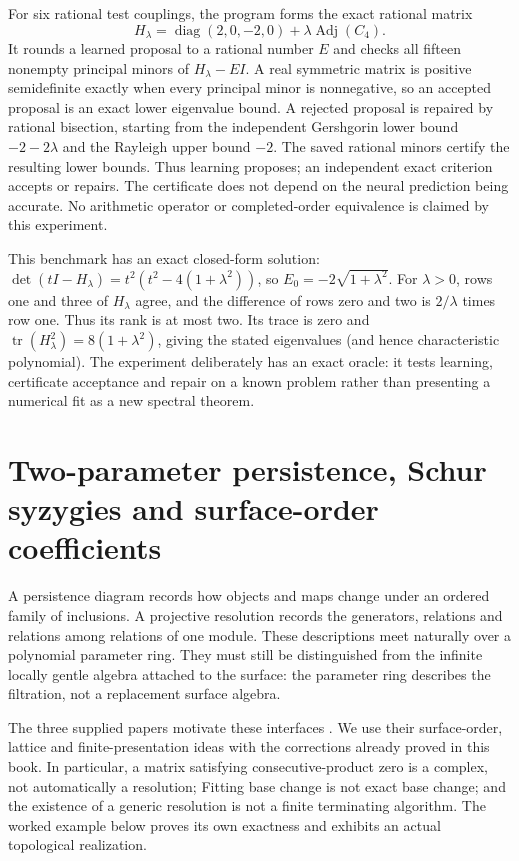 \documentclass[11pt,oneside,openany]{book}
\theoremstyle{definition}\newtheorem{definition}[theorem]{Definition}
\theoremstyle{remark}\newtheorem{remark}[theorem]{Remark}
\begin{document}
For six rational test couplings, the program forms the exact rational matrix
\[
 H_\lambda=\operatorname{diag}(2,0,-2,0)+\lambda\operatorname{Adj}(C_4).
\]
It rounds a learned proposal to a rational number $E$ and checks all fifteen nonempty principal minors of $H_\lambda-EI$. A real symmetric matrix is positive semidefinite exactly when every principal minor is nonnegative, so an accepted proposal is an exact lower eigenvalue bound. A rejected proposal is repaired by rational bisection, starting from the independent Gershgorin lower bound $-2-2\lambda$ and the Rayleigh upper bound $-2$. The saved rational minors certify the resulting lower bounds. Thus learning proposes; an independent exact criterion accepts or repairs. The certificate does not depend on the neural prediction being accurate. No arithmetic operator or completed-order equivalence is claimed by this experiment.

This benchmark has an exact closed-form solution: $\det(tI-H_\lambda)=t^2(t^2-4(1+\lambda^2))$, so $E_0=-2\sqrt{1+\lambda^2}$. For $\lambda>0$, rows one and three of $H_\lambda$ agree, and the difference of rows zero and two is $2/\lambda$ times row one. Thus its rank is at most two. Its trace is zero and $\operatorname{tr}(H_\lambda^2)=8(1+\lambda^2)$, giving the stated eigenvalues (and hence characteristic polynomial). The experiment deliberately has an exact oracle: it tests learning, certificate acceptance and repair on a known problem rather than presenting a numerical fit as a new spectral theorem.

\chapter[Persistence and explicit resolutions]{Two-parameter persistence, Schur syzygies and surface-order coefficients}
\label{pers:chapter}
A persistence diagram records how objects and maps change under an ordered
family of inclusions. A projective resolution records the generators,
relations and relations among relations of one module. These descriptions
meet naturally over a polynomial parameter ring. They must still be
distinguished from the infinite locally gentle algebra attached to the
surface: the parameter ring describes the filtration, not a replacement
surface algebra.

The three supplied papers motivate these interfaces
\cite{PersSurfaceI,PersSurfaceII,PersSurvey}. We use their surface-order,
lattice and finite-presentation ideas with the corrections already proved
in this book. In particular, a matrix satisfying consecutive-product zero
is a complex, not automatically a resolution; Fitting base change is not
exact base change; and the existence of a generic resolution is not a
finite terminating algorithm. The worked example below proves its own
exactness and exhibits an actual topological realization.
\end{document}
